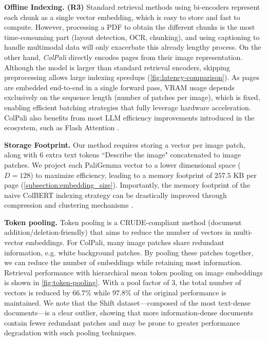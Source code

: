 \noindent\textbf{Offline Indexing. (R3)} 
Standard retrieval methods using bi-encoders represent each chunk as a single vector embedding, which is easy to store and fast to compute. However, processing a PDF to obtain the different chunks is the most time-consuming part (layout detection, OCR, chunking), and using captioning to handle multimodal data will only exacerbate this already lengthy process. On the other hand, \textit{ColPali} directly encodes pages from their image representation. Although the model is larger than standard retrieval encoders, skipping preprocessing allows large indexing speedups (\autoref{fig:latency-comparison}). As pages are embedded end-to-end in a single forward pass, VRAM usage depends exclusively on the sequence length (number of patches per image), which is fixed, enabling efficient batching strategies that fully leverage hardware acceleration. ColPali also benefits from most LLM efficiency improvements introduced in the ecosystem, such as Flash Attention .

\noindent\textbf{Storage Footprint.} Our method requires storing a vector per image patch, along with 6 extra text tokens ``Describe the image" concatenated to image patches. We project each PaliGemma vector to a lower dimensional space ($D=128$) to maximize efficiency, leading to a memory footprint of $257.5$ KB per page (\autoref{subsection:embedding_size}). Importantly, the memory footprint of the naive ColBERT indexing strategy can be drastically improved through compression and clustering mechanisms .

\noindent\textbf{Token pooling.}
Token pooling  is a CRUDE-compliant method (document addition/deletion-friendly) that aims to reduce the number of vectors in multi-vector embeddings. For ColPali, many image patches share redundant information, e.g. white background patches. By pooling these patches together, we can reduce the number of embeddings while retaining most information. Retrieval performance with hierarchical mean token pooling on image embeddings is shown in \autoref{fig:token-pooling}.
With a pool factor of 3, the total number of vectors is reduced by $66.7\%$ while $97.8\%$ of the original performance is maintained. We note that the Shift dataset—composed of the most text-dense documents—is a clear outlier, showing that more information-dense documents contain fewer redundant patches and may be prone to greater performance degradation with such pooling techniques.

